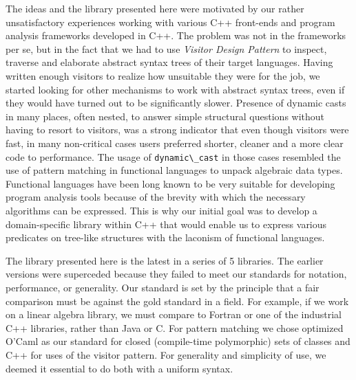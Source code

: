\documentclass[preprint]{sigplanconf}
\makeatletter
\DeclareRobustCommand{\code}[1]{{\lstinline[breaklines=false,escapechar=@]{#1}}}
\makeatother
\begin{document}
The ideas and the library presented here were motivated by our rather 
unsatisfactory experiences working with various C++ front-ends and program 
analysis frameworks developed in C++\cite{Pivot09,Phoenix,Clang,Lise}. The 
problem was not in the frameworks per se, but in the fact that we had to use 
\emph{Visitor Design Pattern}\cite{DesignPatterns1993} to inspect, traverse and 
elaborate abstract syntax trees of their target languages. Having written enough 
visitors to realize how unsuitable they were for the job, we started looking for 
other mechanisms to work with abstract syntax trees, even if they would have 
turned out to be significantly slower. 
Presence of dynamic casts in many places, often nested, to answer simple 
structural questions without having to resort to visitors, was a strong 
indicator that even though visitors were fast, in many non-critical cases 
users preferred shorter, cleaner and a more clear code to performance.
The usage of \code{dynamic\_cast} in those cases resembled the use of 
pattern matching in functional languages to unpack algebraic data types. 
Functional languages have been long known to be very suitable for developing 
program analysis tools because of the brevity with which the necessary 
algorithms can be expressed. This is why our initial goal was to develop a 
domain-specific library within C++ that would enable us to express various 
predicates on tree-like structures with the laconism of functional languages.

The library presented here is the latest in a series of 5 libraries. The earlier 
versions were superceded because they failed to meet our standards for notation, 
performance, or generality. Our standard is set by the principle that a fair 
comparison must be against the gold standard in a field. For example, if we work 
on a linear algebra library, we must compare to Fortran or one of the industrial 
C++ libraries, rather than Java or C. For pattern matching we chose optimized 
O'Caml as our standard for closed (compile-time polymorphic) sets of classes and 
C++ for uses of the visitor pattern. For generality and simplicity of use, we 
deemed it essential to do both with a uniform syntax.

\end{document}
